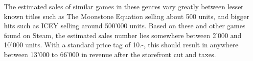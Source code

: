 The estimated sales of similar games in these genres vary greatly between lesser known titles such as The Moonstone Equation selling about 500 units, and bigger hits such as ICEY selling around 500'000 units. Based on these and other games found on Steam, the estimated sales number lies somewhere between 2'000 and 10'000 units. With a standard price tag of 10.-, this should result in anywhere between 13'000 to 66'000 in revenue after the storefront cut and taxes.



